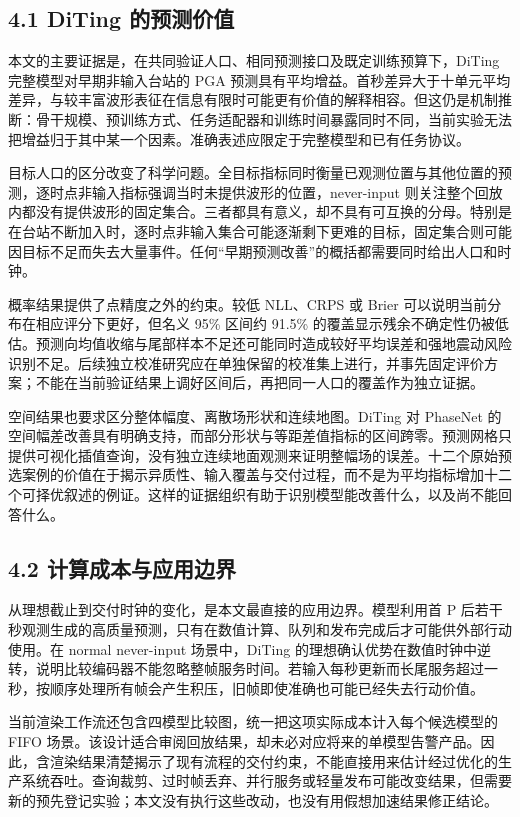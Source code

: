 \documentclass[UTF8,a4paper,11pt]{ctexart}
\begin{document}
\subsection*{4.1 DiTing 的预测价值}

本文的主要证据是，在共同验证人口、相同预测接口及既定训练预算下，DiTing 完整模型对早期非输入台站的 PGA 预测具有平均增益。首秒差异大于十单元平均差异，与较丰富波形表征在信息有限时可能更有价值的解释相容。但这仍是机制推断：骨干规模、预训练方式、任务适配器和训练时间暴露同时不同，当前实验无法把增益归于其中某一个因素。准确表述应限定于完整模型和已有任务协议。

目标人口的区分改变了科学问题。全目标指标同时衡量已观测位置与其他位置的预测，逐时点非输入指标强调当时未提供波形的位置，never-input 则关注整个回放内都没有提供波形的固定集合。三者都具有意义，却不具有可互换的分母。特别是在台站不断加入时，逐时点非输入集合可能逐渐剩下更难的目标，固定集合则可能因目标不足而失去大量事件。任何“早期预测改善”的概括都需要同时给出人口和时钟。

概率结果提供了点精度之外的约束。较低 NLL、CRPS 或 Brier 可以说明当前分布在相应评分下更好，但名义 95\% 区间约 91.5\% 的覆盖显示残余不确定性仍被低估。预测向均值收缩与尾部样本不足还可能同时造成较好平均误差和强地震动风险识别不足。后续独立校准研究应在单独保留的校准集上进行，并事先固定评价方案；不能在当前验证结果上调好区间后，再把同一人口的覆盖作为独立证据。

空间结果也要求区分整体幅度、离散场形状和连续地图。DiTing 对 PhaseNet 的空间幅差改善具有明确支持，而部分形状与等距差值指标的区间跨零。预测网格只提供可视化插值查询，没有独立连续地面观测来证明整幅场的误差。十二个原始预选案例的价值在于揭示异质性、输入覆盖与交付过程，而不是为平均指标增加十二个可择优叙述的例证。这样的证据组织有助于识别模型能改善什么，以及尚不能回答什么。

\subsection*{4.2 计算成本与应用边界}

从理想截止到交付时钟的变化，是本文最直接的应用边界。模型利用首 P 后若干秒观测生成的高质量预测，只有在数值计算、队列和发布完成后才可能供外部行动使用。在 normal never-input 场景中，DiTing 的理想确认优势在数值时钟中逆转，说明比较编码器不能忽略整帧服务时间。若输入每秒更新而长尾服务超过一秒，按顺序处理所有帧会产生积压，旧帧即使准确也可能已经失去行动价值。

当前渲染工作流还包含四模型比较图，统一把这项实际成本计入每个候选模型的 FIFO 场景。该设计适合审阅回放结果，却未必对应将来的单模型告警产品。因此，含渲染结果清楚揭示了现有流程的交付约束，不能直接用来估计经过优化的生产系统吞吐。查询裁剪、过时帧丢弃、并行服务或轻量发布可能改变结果，但需要新的预先登记实验；本文没有执行这些改动，也没有用假想加速结果修正结论。
\end{document}

